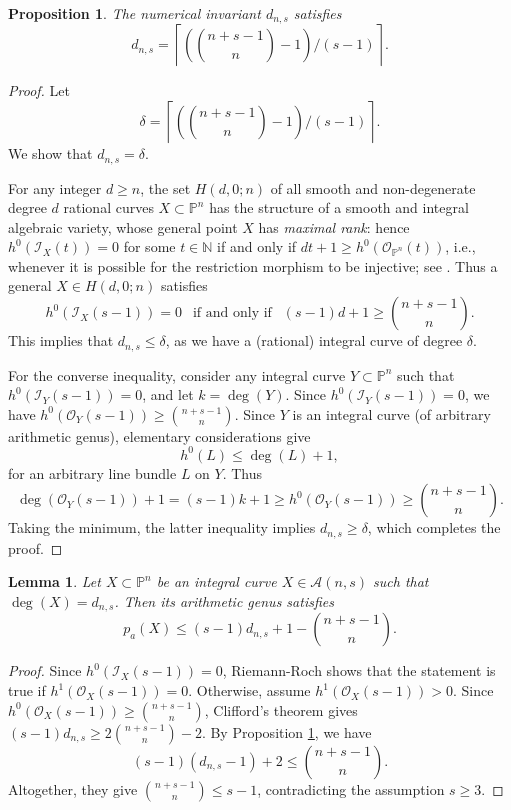 \documentclass[a4, 11pt]{amsart}
\theoremstyle{plain}
\newtheorem{proposition}[theorem]{Proposition}
\newtheorem{lemma}[theorem]{Lemma}
\theoremstyle{definition}
\newcommand{\enm}[1]{\ensuremath{#1}}          %
\newcommand{\cal}[1]{\mathcal{#1}}
\newcommand{\NN}{\enm{\mathbb{N}}}
\newcommand{\PP}{\enm{\mathbb{P}}}
\newcommand{\Aa}{\enm{\cal{A}}}
\newcommand{\Ii}{\enm{\cal{I}}}
\newcommand{\Oo}{\enm{\cal{O}}}
\begin{document}
\begin{proposition}\label{i1}
The numerical invariant $d_{n,s}$ satisfies
\[
d_{n,s} = \left\lceil \left(\binom{n+s-1}{n}-1\right)/(s-1)\right\rceil.
\]
\end{proposition}
\begin{proof}
Let 
\[
\delta =  \left\lceil \left(\binom{n+s-1}{n}-1\right)/(s-1)\right\rceil.
\]
We show that $d_{n,s} = \delta$. 

For any integer $d\ge n$, the set $H(d,0;n)$ of all smooth and non-degenerate degree $d$ rational curves $X\subset \PP^n$ has the structure of a smooth and integral algebraic variety, whose general point $X$ has {\it maximal rank}: hence $h^0(\Ii _X(t)) =0$ for some $t\in \NN$ if and only if $d t+1\geq h^0(\Oo_{\PP^n}(t))$, i.e., whenever it is possible for the restriction morphism to be injective; see \cite{hi, be3}. Thus a general $X\in H(d,0;n)$ satisfies
\[
h^0(\Ii _X(s-1)) =0 \ \ \mbox{ if and only if } \ \ (s-1)d+1\ge \binom{n+s-1}{n}. 
\] 
This implies that $d_{n,s}\leq \delta$, as we have a (rational) integral curve of degree $\delta$. 

For the converse inequality, consider any integral curve $Y\subset \PP^n$ such that $h^0(\Ii _Y(s-1)) =0$, and let $k = \deg (Y)$. Since $h^0(\Ii _Y(s-1)) =0$, we have $h^0(\Oo _Y(s-1)) \ge \binom{n+s-1}{n}$. Since $Y$ is an integral curve (of arbitrary arithmetic genus), elementary considerations give 
\[
h^0(L) \le \deg (L)+1,
\] 
for an arbitrary line bundle $L$ on $Y$. Thus 
\[
\deg(\Oo_Y(s-1))+1 = (s-1)k+1 \ge h^0(\Oo_Y(s-1))\geq \binom{n+s-1}{n}.
\]
Taking the minimum, the latter inequality implies $d_{n,s}\geq \delta$, which completes the proof. 
\end{proof}


\begin{lemma}\label{i2}
Let $X\subset \PP^n$ be an integral curve $X\in \Aa(n,s)$ such that $\deg (X)=d_{n,s}$. Then its arithmetic genus satisfies
\[
p_a(X) \le (s-1)d_{n,s}+1-\binom{n+s-1}{n}.
\]
\end{lemma}

\begin{proof}
Since $h^0(\Ii _X(s-1))=0$, Riemann-Roch shows that the statement is true if $h^1(\Oo _X(s-1)) =0$. Otherwise, assume $h^1(\Oo _X(s-1)) >0$. Since $h^0(\Oo _X(s-1)) \ge \binom{n+s-1}{n}$, Clifford's theorem gives $(s-1)d_{n,s} \ge 2\binom{n+s-1}{n}-2$. By Proposition \ref{i1}, we have 
\[
(s-1)(d_{n,s} -1)+2 \le \binom{n+s-1}{n}.
\]
Altogether, they give $\binom{n+s-1}{n}\le s-1$, contradicting the assumption $s\ge 3$.  
\end{proof}
\end{document}
